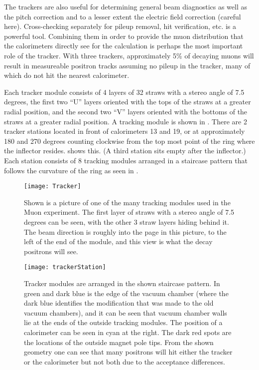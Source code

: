 The trackers are also useful for determining general beam diagnostics as well as the pitch correction and to a lesser extent the electric field correction (careful here). Cross-checking separately for pileup removal, hit verification, etc. is a powerful tool. Combining them in order to provide the muon distribution that the calorimeters directly see for the \wa calculation is perhaps the most important role of the tracker. With three trackers, approximately 5\% of decaying muons will result in measureable positron tracks assuming no pileup in the tracker, many of which do not hit the nearest calorimeter.

Each tracker module consists of 4 layers of 32 straws with a stereo angle of 7.5 degrees, the first two ``U'' layers oriented with the tops of the straws at a greater radial position, and the second two ``V'' layers oriented with the bottoms of the straws at a greater radial position. A tracking module is shown in . There are 2 tracker stations located in front of calorimeters 13 and 19, or at approximately 180 and 270 degrees counting clockwise from the top most point of the ring where the inflector resides.  shows this. (A third station sits empty after the inflector.) Each station consists of 8 tracking modules arranged in a staircase pattern that follows the curvature of the ring as seen in .

\begin{figure}[]
    \centering
    \texttt{[image: Tracker]}
    \caption[Tracker module]{Shown is a picture of one of the many tracking modules used in the Muon \gmtwo experiment. The first layer of straws with a stereo angle of 7.5 degrees can be seen, with the other 3 straw layers hiding behind it. The beam direction is roughly into the page in this picture, to the left of the end of the module, and this view is what the decay positrons will see.}
    \label{fig:tracker}
\end{figure}

\begin{figure}[]
    \centering
    \texttt{[image: trackerStation]}
    \caption[Tracker module arrangement]{Tracker modules are arranged in the shown staircase pattern. In green and dark blue is the edge of the vacuum chamber (where the dark blue identifies the modification that was made to the old vacuum chambers), and it can be seen that vacuum chamber walls lie at the ends of the outside tracking modules. The position of a calorimeter can be seen in cyan at the right. The dark red spots are the locations of the outside magnet pole tips. From the shown geometry one can see that many positrons will hit either the tracker or the calorimeter but not both due to the acceptance differences.}
    \label{fig:staircase}
\end{figure}

